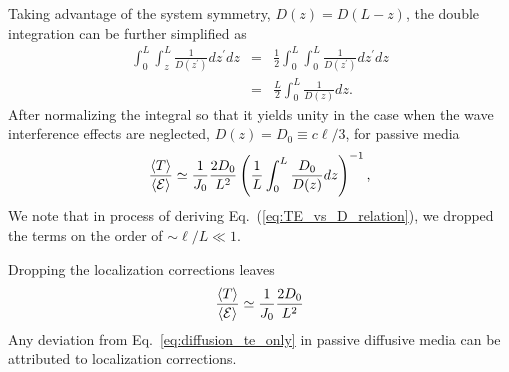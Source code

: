 Taking advantage of the system symmetry, $D(z)=D(L-z)$, the double integration can be further simplified as
\begin{eqnarray}
\displaystyle\int_{0}^{L}\int_{z}^{L}\displaystyle\frac{1}{D(z^\prime)}dz^\prime dz &=&\frac{1}{2}\displaystyle\int_{0}^{L}\int_{0}^{L}\displaystyle\frac{1}{D(z^\prime)}dz^\prime dz \nonumber\\
&=&\frac{L}{2}\int_{0}^{L}\displaystyle\frac{1}{D(z)}dz.
\label{eq:E3_relation}
\end{eqnarray}
After normalizing the integral so that it yields unity in the case when the wave interference effects are neglected, $D(z)=D_0\equiv c\ell/3$, for passive media
\begin{equation}
\frac{\langle T \rangle}{\langle {\cal E} \rangle}\simeq
\frac{1}{J_0}
\frac{2D_0}{L^2}
\left(
\displaystyle\frac{1}{L}\displaystyle\int_{0}^{L}\displaystyle\frac{D_0}{D(z)}dz
\right)^{-1},
\label{eq:TE_vs_D_relation}
\end{equation}
We note that in process of deriving Eq.~(\ref{eq:TE_vs_D_relation}), we dropped the terms on the order of $\sim\ell/L\ll 1$.


Dropping the localization corrections leaves
\begin{equation}
\frac{\langle T \rangle}{\langle {\cal E} \rangle}\simeq \frac{1}{J_0} \frac{2D_0}{L^2}
\label{eq:diffusion_te_only}
\end{equation}
Any deviation from Eq.~\ref{eq:diffusion_te_only} in passive diffusive media can be attributed to localization corrections.
